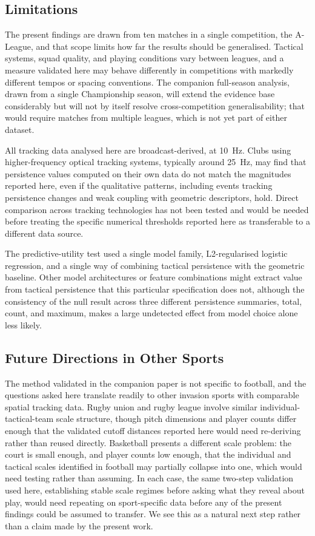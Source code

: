 \subsection{Limitations}

The present findings are drawn from ten matches in a single
competition, the A-League, and that scope limits how far the results
should be generalised. Tactical systems, squad quality, and playing
conditions vary between leagues, and a measure validated here may
behave differently in competitions with markedly different tempos or
spacing conventions. The companion full-season analysis, drawn from a
single Championship season, will extend the evidence base considerably
but will not by itself resolve cross-competition generalisability; that
would require matches from multiple leagues, which is not yet part of
either dataset.

All tracking data analysed here are broadcast-derived, at 10~Hz. Clubs
using higher-frequency optical tracking systems, typically around
25~Hz, may find that persistence values computed on their own data do
not match the magnitudes reported here, even if the qualitative
patterns, including events tracking persistence changes and weak
coupling with geometric descriptors, hold. Direct comparison across tracking
technologies has not been tested and would be needed before treating
the specific numerical thresholds reported here as transferable to a
different data source.

The predictive-utility test used a single model family, L2-regularised
logistic regression, and a single way of combining tactical persistence
with the geometric baseline. Other model architectures or feature
combinations might extract value from tactical persistence that this
particular specification does not, although the consistency of the null result across three different persistence summaries, total, count, and maximum, makes a large undetected effect from model
choice alone less likely.

\subsection{Future Directions in Other Sports}

The method validated in the companion paper is not specific to
football, and the questions asked here translate readily to other
invasion sports with comparable spatial tracking data. Rugby union and
rugby league involve similar individual-tactical-team scale structure,
though pitch dimensions and player counts differ enough that the
validated cutoff distances reported here would need re-deriving rather
than reused directly. Basketball presents a different scale problem:
the court is small enough, and player counts low enough, that the
individual and tactical scales identified in football may partially
collapse into one, which would need testing rather than assuming. In
each case, the same two-step validation used here, establishing stable scale regimes before asking what they reveal about play, would
need repeating on sport-specific data before any of the present
findings could be assumed to transfer. We see this as a natural next
step rather than a claim made by the present work.
